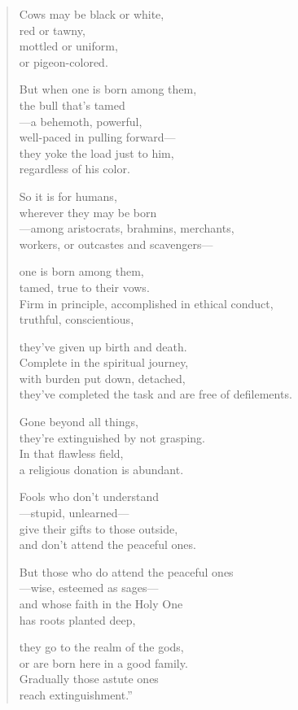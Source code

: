 \documentclass[12pt,openany]{book}%
\begin{document}
\begin{verse}%
Cows may be black or white, \\
red or tawny, \\
mottled or uniform, \\
or pigeon-colored. 

But when one is born among them, \\
the bull that’s tamed \\
—a behemoth, powerful, \\
well-paced in pulling forward—\\
they yoke the load just to him, \\
regardless of his color. 

So it is for humans, \\
wherever they may be born \\
—among aristocrats, brahmins, merchants, \\
workers, or outcastes and scavengers—

one is born among them, \\
tamed, true to their vows. \\
Firm in principle, accomplished in ethical conduct, \\
truthful, conscientious, 

they’ve given up birth and death. \\
Complete in the spiritual journey, \\
with burden put down, detached, \\
they’ve completed the task and are free of defilements. 

Gone beyond all things, \\
they’re extinguished by not grasping. \\
In that flawless field, \\
a religious donation is abundant. 

Fools who don’t understand \\
—stupid, unlearned—\\
give their gifts to those outside, \\
and don’t attend the peaceful ones. 

But those who do attend the peaceful ones \\
—wise, esteemed as sages—\\
and whose faith in the Holy One \\
has roots planted deep, 

they go to the realm of the gods, \\
or are born here in a good family. \\
Gradually those astute ones \\
reach extinguishment.” 

%
\end{verse}
\end{document}
